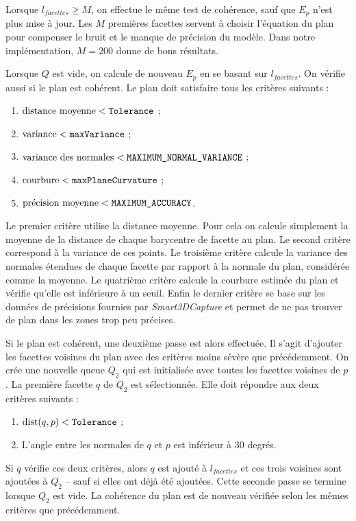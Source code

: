 \documentclass[12pt, twoside]{article}
\begin{document}
Lorsque $l_{facettes} \geq M$, on effectue le même test de cohérence, sauf que $E_p$ n'est plus mise à jour. Les $M$ premières facettes servent à choisir l'équation du plan pour compenser le bruit et le manque de précision du modèle. Dans notre implémentation, $M = 200$ donne de bons résultats.

Lorsque $Q$ est vide, on calcule de nouveau $E_p$ en se basant sur $l_{facettes}$. On vérifie aussi si le plan est cohérent. Le plan doit satisfaire tous les critères suivants :
\begin{enumerate}
  \item $\text{distance moyenne} < \text{\texttt{Tolerance}}$ ;
  \item $\text{variance} < \text{\texttt{maxVariance}}$ ;
  \item $\text{variance des normales} < \text{\texttt{MAXIMUM\_NORMAL\_VARIANCE}}$ ;
  \item $\text{courbure} < \text{\texttt{maxPlaneCurvature}}$ ;
  \item $\text{précision moyenne} < \text{\texttt{MAXIMUM\_ACCURACY}}$.
\end{enumerate}
Le premier critère utilise la distance moyenne. Pour cela on calcule simplement la moyenne de la distance de chaque barycentre de facette au plan. Le second critère correspond à la variance de ces points. Le troisième critère calcule la variance des normales étendues de chaque facette par rapport à la normale du plan, considérée comme la moyenne. Le quatrième critère calcule la courbure estimée du plan et vérifie qu'elle est inférieure à un seuil. Enfin le dernier critère se base sur les données de précisions fournies par \textit{Smart3DCapture} et permet de ne pas trouver de plan dans les zones trop peu précises.

Si le plan est cohérent, une deuxième passe est alors effectuée. Il s'agit d'ajouter les facettes voisines du plan avec des critères moins sévère que précédemment. On crée une nouvelle queue $Q_2$ qui est initialisée avec toutes les facettes voisines de $p$. La première facette $q$ de $Q_2$ est sélectionnée. Elle doit répondre aux deux critères suivants :
\begin{enumerate}
  \item $\text{dist}(q, p) < \text{\texttt{Tolerance}}$ ;
  \item L'angle entre les normales de $q$ et $p$ est inférieur à 30 degrés.
\end{enumerate}
Si $q$ vérifie ces deux critères, alors $q$ est ajouté à $l_{facettes}$ et ces trois voisines sont ajoutées à $Q_2$ -- sauf si elles ont déjà été ajoutées. Cette seconde passe se termine lorsque $Q_2$ est vide. La cohérence du plan est de nouveau vérifiée selon les mêmes critères que précédemment.
\end{document}
